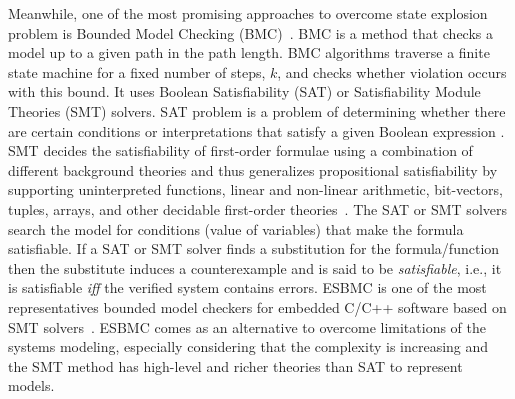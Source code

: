 \documentclass[journal]{IEEEtran}
\begin{document}
Meanwhile, one of the most promising approaches to overcome state explosion problem is Bounded Model Checking (BMC)~\cite{DBLP:conf/tacas/BiereCCZ99}. BMC is a method that checks a model up to a given path in the path length. BMC algorithms traverse a finite state machine for a fixed number of steps, $ k $, and checks whether violation occurs with this bound. It uses Boolean Satisfiability (SAT) or Satisfiability Module Theories (SMT) solvers. SAT problem is a problem of determining whether there are certain conditions or interpretations that satisfy a given Boolean expression \cite{ClarkeHV18}. 
SMT decides the satisfiability of first-order formulae using a combination of different background theories and thus generalizes propositional satisfiability by supporting uninterpreted functions, linear and non-linear arithmetic, bit-vectors, tuples, arrays, and other decidable first-order theories~\cite{ClarkeHV18}.
The SAT or SMT solvers search the model for conditions (value of variables) that make the formula satisfiable. If a SAT or SMT solver finds a substitution for the formula/function then the substitute induces a counterexample and is said to be \textit{satisfiable}, i.e., it is satisfiable \textit{iff} the verified system contains errors.  
%
%
%
ESBMC is one of the most representatives bounded model checkers for embedded C/C++ software based on SMT solvers~\cite{esbmc2018}. %
ESBMC comes as an alternative to overcome limitations of the systems modeling, especially considering that the complexity is increasing and the SMT method has high-level and richer theories than SAT to represent models. 

\end{document}
